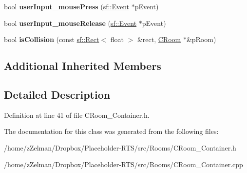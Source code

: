 \begin{DoxyCompactItemize}
\item 
\hypertarget{classCRoom__Container_a84080540b5cb7a400662aba47fee60fc}{bool {\bfseries user\-Input\-\_\-mouse\-Press} (\hyperlink{classsf_1_1Event}{sf\-::\-Event} $\ast$p\-Event)}\label{classCRoom__Container_a84080540b5cb7a400662aba47fee60fc}

\item 
\hypertarget{classCRoom__Container_adb9e0db332c48e7baabf55d7e14ac512}{bool {\bfseries user\-Input\-\_\-mouse\-Release} (\hyperlink{classsf_1_1Event}{sf\-::\-Event} $\ast$p\-Event)}\label{classCRoom__Container_adb9e0db332c48e7baabf55d7e14ac512}

\item 
\hypertarget{classCRoom__Container_a2eb1c5bc2aef2804cb15cbedd5fc649a}{bool {\bfseries is\-Collision} (const \hyperlink{classsf_1_1Rect}{sf\-::\-Rect}$<$ float $>$ \&rect, \hyperlink{classCRoom}{C\-Room} $\ast$\&p\-Room)}\label{classCRoom__Container_a2eb1c5bc2aef2804cb15cbedd5fc649a}

\end{DoxyCompactItemize}
\subsection*{Additional Inherited Members}


\subsection{Detailed Description}


Definition at line 41 of file C\-Room\-\_\-\-Container.\-h.



The documentation for this class was generated from the following files\-:\begin{DoxyCompactItemize}
\item 
/home/z\-Zelman/\-Dropbox/\-Placeholder-\/\-R\-T\-S/src/\-Rooms/C\-Room\-\_\-\-Container.\-h\item 
/home/z\-Zelman/\-Dropbox/\-Placeholder-\/\-R\-T\-S/src/\-Rooms/C\-Room\-\_\-\-Container.\-cpp\end{DoxyCompactItemize}
